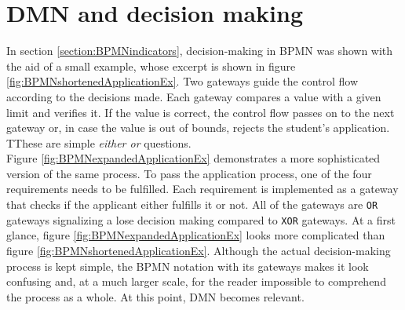 \section{DMN and decision making}
In section \ref{section:BPMNindicators}, decision-making in BPMN was shown with the aid of a small example, whose excerpt is shown in figure \ref{fig:BPMNshortenedApplicationEx}. Two gateways guide the control flow according to the decisions made. Each gateway compares a value with a given limit and verifies it. If the value is correct, the control flow passes on to the next gateway or, in case the value is out of bounds, rejects the student's application. TThese are simple \textit{either or} questions. \\
Figure \ref{fig:BPMNexpandedApplicationEx} demonstrates a more sophisticated version of the same process. To pass the application process,  one of the four requirements needs to be fulfilled. Each requirement is implemented as a gateway that checks if the applicant either fulfills it or not. All of the gateways are \texttt{OR} gateways signalizing a lose decision making compared to \texttt{XOR} gateways. At a first glance, figure \ref{fig:BPMNexpandedApplicationEx} looks more complicated than figure \ref{fig:BPMNshortenedApplicationEx}. Although the actual decision-making process is kept simple, the BPMN notation with its gateways makes it look confusing and, at a much larger scale, for the reader impossible to comprehend the process as a whole. At this point, DMN becomes relevant. 

